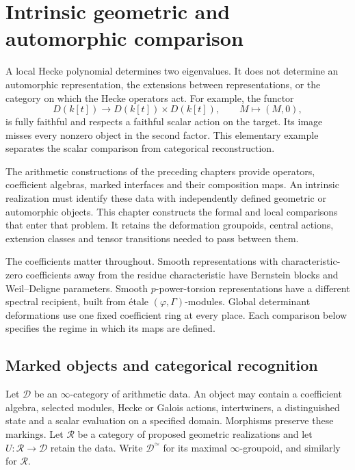 \chapter{Intrinsic geometric and automorphic comparison}
\label{v4-arith:ic:chapter}

A local Hecke polynomial determines two eigenvalues. It does not
determine an automorphic representation, the extensions between
representations, or the category on which the Hecke operators act.
For example, the functor
\[
 D(k[t])\longrightarrow D(k[t])\times D(k[t]),
 \qquad M\longmapsto(M,0),
\]
is fully faithful and respects a faithful scalar action on the target.
Its image misses every nonzero object in the second factor.
This elementary example separates the scalar comparison from
categorical reconstruction.

The arithmetic constructions of the preceding chapters provide
operators, coefficient algebras, marked interfaces and their
composition maps. An intrinsic realization must identify these data
with independently defined geometric or automorphic objects.
This chapter constructs the formal and local comparisons that enter
that problem. It retains the deformation groupoids, central actions,
extension classes and tensor transitions needed to pass between them.

The coefficients matter throughout. Smooth representations with
characteristic-zero coefficients away from the residue characteristic
have Bernstein blocks and Weil--Deligne parameters. Smooth
\(p\)-power-torsion representations have a different spectral recipient,
built from étale \((\varphi,\Gamma)\)-modules. Global determinant
deformations use one fixed coefficient ring at every place.
Each comparison below specifies the regime in which its maps are
defined.

\section{Marked objects and categorical recognition}
\label{v4-arith:ic:recognition}

Let \(\mathscr D\) be an \(\infty\)-category of arithmetic data.
An object may contain a coefficient algebra, selected modules,
Hecke or Galois actions, intertwiners, a distinguished state and
a scalar evaluation on a specified domain. Morphisms preserve
these markings. Let \(\mathscr R\) be a category of proposed geometric
realizations and let \(U:\mathscr R\to\mathscr D\) retain the data.
Write \(\mathscr D^\simeq\) for its maximal \(\infty\)-groupoid,
and similarly for \(\mathscr R\).

